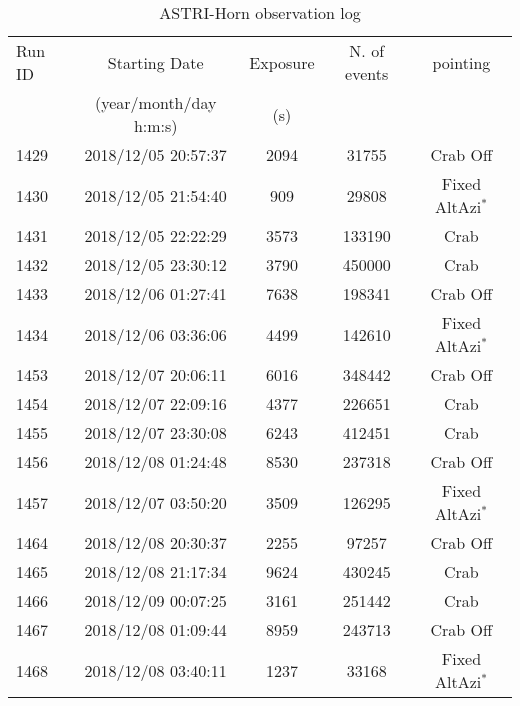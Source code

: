 \begin{table}[ht]
\label{tab:astrilog}
\caption{ASTRI-Horn observation log}
\centering
\begin{tabular}{lcccc}
\hline\hline
Run ID & Starting Date & Exposure      & N. of events & pointing \\
               & (year/month/day h:m:s) & (s)  \\
\hline     
1429 & 2018/12/05 20:57:37  &   2094     & 31755 & Crab Off    \\
1430 & 2018/12/05 21:54:40  &   909      & 29808 & Fixed AltAzi$^*$    \\
1431 & 2018/12/05 22:22:29  &   3573     & 133190 & Crab     \\ %
1432 & 2018/12/05 23:30:12  &   3790     & 450000 & Crab     \\ %
1433 & 2018/12/06 01:27:41  &   7638     & 198341 & Crab Off    \\ %
1434 & 2018/12/06 03:36:06  &   4499     & 142610 &  Fixed AltAzi$^*$  \\ %
1453 & 2018/12/07 20:06:11  &   6016     & 348442 & Crab Off    \\
1454 & 2018/12/07 22:09:16  &   4377     & 226651 &  Crab \\ %
1455 & 2018/12/07 23:30:08  &   6243     & 412451 &  Crab \\ %
1456 & 2018/12/08 01:24:48  &  8530     & 237318 & Crab Off \\ %
1457 & 2018/12/07 03:50:20  &  3509     & 126295 & Fixed AltAzi$^*$\\ %
1464 & 2018/12/08 20:30:37 &  2255 & 97257 & Crab Off \\ %
1465 & 2018/12/08 21:17:34 &  9624 & 430245 & Crab\\ %
1466 & 2018/12/09 00:07:25 &  3161 & 251442 & Crab \\ %
1467 & 2018/12/08 01:09:44 &  8959 & 243713 & Crab Off \\ %
1468 & 2018/12/08 03:40:11 &  1237 & 33168 &  Fixed AltAzi$^*$\\ %

\end{tabular}
\end{table}
